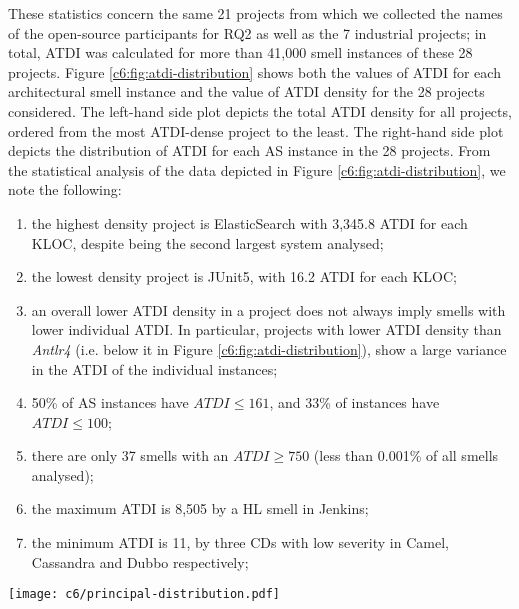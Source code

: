 These statistics concern the same 21 projects from which we collected the names of the open-source participants for RQ2 as well as the 7 industrial projects; in total, ATDI was calculated for more than 41,000 smell instances of these 28 projects.
Figure \ref{c6:fig:atdi-distribution} shows both the values of ATDI for each architectural smell instance and the value of ATDI density for the 28 projects considered.
The left-hand side plot depicts the total ATDI density for all projects, ordered from the most ATDI-dense project to the least.
The right-hand side plot depicts the distribution of ATDI for each AS instance in the 28 projects.
From the statistical analysis of the data depicted in Figure \ref{c6:fig:atdi-distribution}, we note the following:
\begin{enumerate}
    \item the highest density project is ElasticSearch with 3,345.8 ATDI for each KLOC, despite being the second largest system analysed;
    \item the lowest density project is JUnit5, with 16.2 ATDI for each KLOC;
    \item an overall lower ATDI density in a project does not always imply smells with lower individual ATDI. In particular, projects with lower ATDI density than \emph{Antlr4} (i.e. below it in Figure \ref{c6:fig:atdi-distribution}), show a large variance in the ATDI of the individual instances;
    \item 50\% of AS instances have $ATDI \le 161$, and 33\% of instances have $ATDI \le 100$;
    \item there are only 37 smells with an $ATDI \ge 750$ (less than 0.001\% of all smells analysed);
    \item the maximum ATDI is 8,505 by a HL smell in Jenkins;
    \item the minimum ATDI is 11, by three CDs with low severity in Camel, Cassandra and Dubbo respectively;
\end{enumerate}

\begin{figure*}
    \centering
    \texttt{[image: c6/principal-distribution.pdf]}
    \caption{On the left, the total amount of principal (ATDI) per 1,000 lines of code (KLOC) for each project (calculated using Equation \ref{c6:eq:atdi-normalised}) compared with the number of KLOC. 
    On the right, boxplots depicting the distribution of the principal (ATDI) calculated for each AS instance (outliers not visualised). }\label{c6:fig:atdi-distribution}
\end{figure*}

